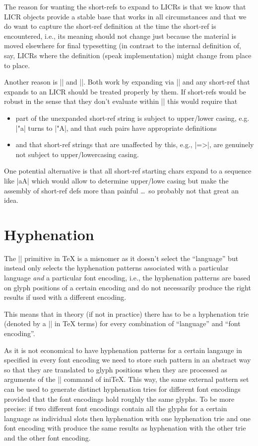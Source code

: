 \documentclass{ltxdoc}
\let\m\meta
\begin{document}
The reason for wanting the short-refs to expand to LICRs is that we
know that LICR objects provide a stable base that works in all
circumstances and that we do want to capture the short-ref definition
at the time the short-ref is encountered, i.e., its meaning should not
change just because the material is moved elsewhere for final
typesetting (in contrast to the internal definition of, say, LICRs
where the definition (speak implementation) might change from place to
place.

Another reason is |\MakeUppercase| and |\MakeLowercase|. Both work by
expanding via |\protected@edef| and any short-ref that expands to an
LICR should be treated properly by them. If short-refs would be robust
in the sense that they don't evaluate within |\protected@edef| this
would require that
\begin{itemize}
\item part of the unexpanded short-ref string is subject to
  upper/lower casing, e.g. |"a| turns to |"A|, and that such pairs
  have appropriate definitions
\item and that short-ref strings that are unaffected by this, e.g.,
  |=>|, are genuinely not subject to upper/lowercasing casing.
\end{itemize}
One potential alternative is that all short-ref starting chars expand
to a sequence like |\sref aA|\m{orig-char-catcode-12} which would
allow to determine upper/lowe casing but make the assembly of
short-ref defs more than painful \ldots\ so probably not that great an
idea.


\section{Hyphenation}

The |\language| primitive in \TeX{} is a misnomer as it doesn't select
the ``language'' but instead only selects the hyphenation patterns
associated with a particular language \emph{and} a particular font
encoding, i.e., the hyphenation patterns are based on glyph positions
of a certain encoding and do not necessarily produce the right results
if used with a different encoding.

This means that in theory (if not in practice) there has to be a
hyphenation trie (denoted by a |\language| in \TeX{} terms) for every
combination of ``language'' and ``font encoding''.

As it is not economical to have hyphenation patterns for a certain
langauge in specified in every font encoding we need to store such
pattern in an abstract way so that they are translated to glyph
positions when they are processed as arguments of the |\pattern|
command of ini\TeX{}. This way, the same external pattern set can be
used to generate distinct hyphenation tries for different font
encodings provided that the font encodings hold roughly the same
glyphs. To be more precise: if two different font encodings contain
all the glyphs for a certain language as individual slots then
hyphenation with one hyphenation trie and one font encoding with
produce the same results as hyphenation with the other trie and the
other font encoding.
\end{document}
